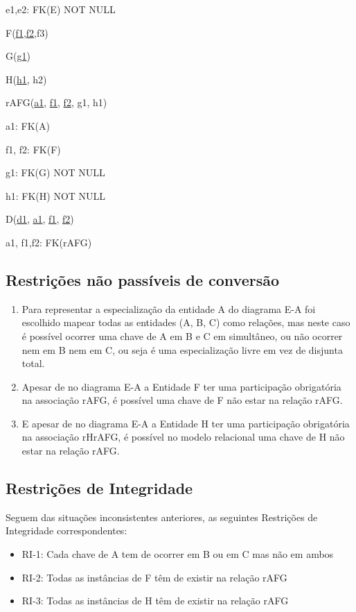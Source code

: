 \documentclass{article}
\begin{document}
\quad e1,e2: FK(E) NOT NULL

F(\underline{f1},\underline{f2},f3)

G(\underline{g1})

H(\underline{h1}, h2) 


rAFG(\underline{a1}, \underline{f1}, \underline{f2}, g1, h1)

\quad a1: FK(A)

\quad f1, f2: FK(F)

\quad g1: FK(G) NOT NULL

\quad h1: FK(H) NOT NULL


D(\underline{d1}, \underline{a1}, \underline{f1}, \underline{f2})

\quad a1, f1,f2: FK(rAFG)

\subsection{Restrições não passíveis de conversão}
\begin{enumerate}
\item Para representar a especialização da entidade A do diagrama E-A foi escolhido mapear todas as entidades (A, B, C) como relações, mas neste caso é possível ocorrer uma chave de A em B e C em simultâneo, ou não ocorrer nem em B nem em C, ou seja é uma especialização livre em vez de disjunta total.
\item Apesar de no diagrama E-A a Entidade F ter uma participação obrigatória na associação rAFG, é possível uma chave de F não estar na relação rAFG.
\item E apesar de no diagrama E-A a Entidade H ter uma participação obrigatória na associação rHrAFG, é possível no modelo relacional uma chave de H não estar na relação rAFG.
\end{enumerate}

\subsection{Restrições de Integridade}
Seguem das situações inconsistentes anteriores, as seguintes Restrições de Integridade correspondentes: 
\begin{itemize}
    \item RI-1: Cada chave de A tem de ocorrer em B ou em C mas não em ambos
    \item RI-2: Todas as instâncias de F têm de existir na relação rAFG
    \item RI-3: Todas as instâncias de H têm de existir na relação rAFG
\end{itemize}
\end{document}
